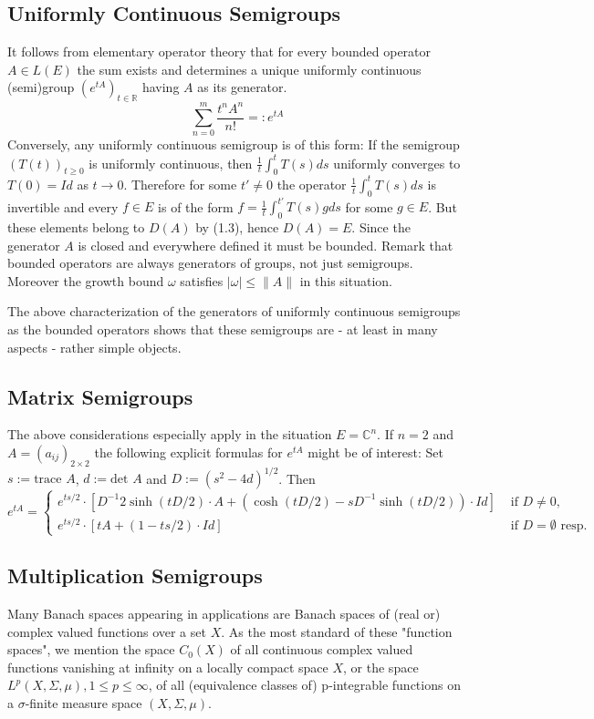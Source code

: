\subsection{Uniformly Continuous Semigroups}
It follows from elementary operator theory that for every bounded operator $A \in L(E)$ the sum exists and determines a unique uniformly continuous (semi)group $(e^{tA})_{t \in \mathbb{R}}$ having $A$ as its generator.
\[
\sum_{n=0}^{m} \frac{t^n A^n}{n!} =: e^{tA}
\]
Conversely, any uniformly continuous semigroup is of this form: If the semigroup $(T(t))_{t \geq 0}$ is uniformly continuous, then $\frac{1}{t} \int_{0}^{t} T(s) ds$ uniformly converges to $T(0)=Id$ as $t \rightarrow 0$.
Therefore for some $t' \neq 0$ the operator $\frac{1}{t} \int_{0}^{t} T(s) ds$ is invertible and every $f \in E$ is of the form $f=\frac{1}{t} \int_{0}^{t'} T(s) g ds$ for some $g \in E$.
But these elements belong to $D(A)$ by (1.3), hence $D(A)=E$.
Since the generator $A$ is closed and everywhere defined it must be bounded.
Remark that bounded operators are always generators of groups, not just semigroups.
Moreover the growth bound $\omega$ satisfies $|\omega| \leq \|A\|$ in this situation.

The above characterization of the generators of uniformly continuous semigroups as the bounded operators shows that these semigroups are - at least in many aspects - rather simple objects.
\subsection{Matrix Semigroups}
The above considerations especially apply in the situation $E=\mathbb{C}^n$.
If $n=2$ and $A=(a_{ij})_{2\times 2}$ the following explicit formulas for $e^{tA}$ might be of interest:
Set $s:=\text{trace }A$, $d:=\text{det }A$ and $D:=(s^2-4d)^{1/2}$.
Then
\[
e^{tA}  = 
\begin{cases}
e^{ts/2} \cdot [D^{-1} 2\sinh(tD/2) \cdot A + (\cosh(tD/2)-sD^{-1}\sinh(tD/2)) \cdot Id] & \text{ if } D \neq 0, \\
e^{ts/2} \cdot [tA+(1-ts/2) \cdot Id] & \text{ if $D=\emptyset$ resp.}
\end{cases}
\]
\subsection{Multiplication Semigroups}
Many Banach spaces appearing in applications are Banach spaces of (real or) complex valued functions over a set $X$.
As the most standard of these "function spaces", we mention the space $C_0(X)$ of all continuous complex valued functions vanishing at infinity on a locally compact space $X$, or the space $L^p(X,\Sigma,\mu), 1 \leq p \leq \infty$, of all (equivalence classes of) p-integrable functions on a $\sigma$-finite measure space $(X,\Sigma,\mu)$.

